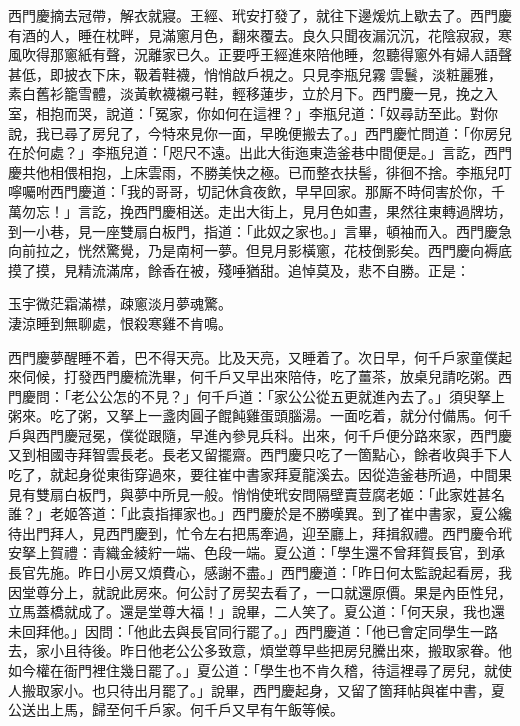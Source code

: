 西門慶摘去冠帶，解衣就寢。王經、玳安打發了，就往下邊煖炕上歇去了。西門慶有酒的人，睡在枕畔，見滿窻月色，翻來覆去。良久只聞夜漏沉沉，花陰寂寂，寒風吹得那窻紙有聲，況離家已久。正要呼王經進來陪他睡，忽聽得窻外有婦人語聲甚低，即披衣下床，靸着鞋襪，悄悄啟戶視之。只見李瓶兒霧𩬆雲鬟，淡粧麗雅，素白舊衫籠雪體，淡黃軟襪襯弓鞋，輕移蓮步，立於月下。{}西門慶一見，挽之入室，相抱而哭，說道：「冤家，你如何在這裡？」李瓶兒道：「奴尋訪至此。對你說，我已尋了房兒了，今特來見你一面，早晚便搬去了。」西門慶忙問道：「你房兒在於何處？」李瓶兒道：「咫尺不遠。出此大街迤東造釜巷中間便是。」言訖，西門慶共他相偎相抱，上床雲雨，不勝美快之極。已而整衣扶髻，徘徊不捨。李瓶兒叮嚀囑咐西門慶道：「我的哥哥，切記休貪夜飲，早早回家。那厮不時伺害於你，千萬勿忘！」言訖，挽西門慶相送。走出大街上，見月色如晝，果然往東轉過牌坊，到一小巷，見一座雙扇白板門，指道：「此奴之家也。」言畢，頓袖而入。西門慶急向前拉之，恍然驚覺，乃是南柯一夢。但見月影橫窻，花枝倒影矣。{}西門慶向褥底摸了摸，見精流滿席，餘香在被，殘唾猶甜。追悼莫及，悲不自勝。正是：

\begin{myquote}
玉宇微茫霜滿襟，疎窻淡月夢魂驚。\\淒涼睡到無聊處，恨殺寒雞不肯鳴。
\end{myquote}

西門慶夢醒睡不着，巴不得天亮。比及天亮，又睡着了。次日早，何千戶家童僕起來伺候，打發西門慶梳洗畢，何千戶又早出來陪侍，吃了薑茶，放桌兒請吃粥。西門慶問：「老公公怎的不見？」何千戶道：「家公公從五更就進內去了。」須臾拏上粥來。吃了粥，又拏上一盞肉圓子餛飩雞蛋頭腦湯。一面吃着，就分付備馬。何千戶與西門慶冠冕，僕從跟隨，早進內參見兵科。出來，何千戶便分路來家，西門慶又到相國寺拜智雲長老。{}長老又留擺齋。西門慶只吃了一箇點心，餘者收與手下人吃了，就起身從東街穿過來，要往崔中書家拜夏龍溪去。因從造釜巷所過，中間果見有雙扇白板門，與夢中所見一般。悄悄使玳安問隔壁賣荳腐老姬：「此家姓甚名誰？」老姬答道：「此袁指揮家也。」西門慶於是不勝嘆異。到了崔中書家，夏公纔待出門拜人，見西門慶到，忙令左右把馬牽過，迎至廳上，拜揖叙禮。西門慶令玳安拏上賀禮：青織金綾紵一端、色段一端。夏公道：「學生還不曾拜賀長官，到承長官先施。昨日小房又煩費心，感謝不盡。」西門慶道：「昨日何太監說起看房，我因堂尊分上，就說此房來。何公討了房契去看了，一口就還原價。果是內臣性兒，立馬蓋橋就成了。還是堂尊大福！」說畢，二人笑了。夏公道：「何天泉，我也還未回拜他。」因問：「他此去與長官同行罷了。」西門慶道：「他已會定同學生一路去，家小且待後。昨日他老公公多致意，煩堂尊早些把房兒騰出來，搬取家眷。他如今權在衙門裡住幾日罷了。」夏公道：「學生也不肯久稽，待這裡尋了房兒，就使人搬取家小。也只待出月罷了。」說畢，西門慶起身，又留了箇拜帖與崔中書，夏公送出上馬，歸至何千戶家。何千戶又早有午飯等候。

